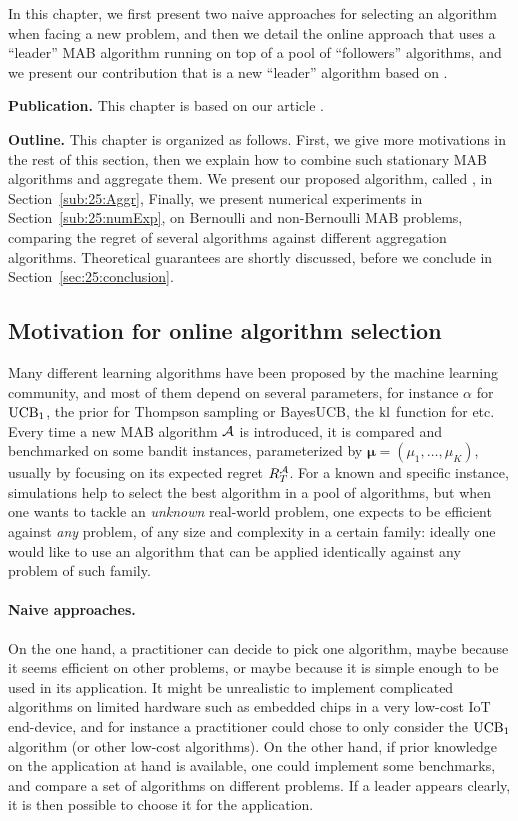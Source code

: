 In this chapter, we first present two naive approaches for selecting an algorithm when facing a new problem, and then we detail the online approach that uses a ``leader'' MAB algorithm running on top of a pool of ``followers'' algorithms, and we present our contribution that is a new ``leader'' algorithm based on \ExpQ.


\textbf{Publication.}
%
This chapter is based on our article \cite{Besson2018WCNC}.


\textbf{Outline.}
%
This chapter is organized as follows.
First, we give more motivations in the rest of this section, then we explain how to combine such stationary MAB algorithms and aggregate them.
We present our proposed algorithm, called \Aggr, in Section~\ref{sub:25:Aggr},
Finally, we present numerical experiments in Section~\ref{sub:25:numExp},
on Bernoulli and non-Bernoulli MAB problems,
comparing the regret of several algorithms against different aggregation algorithms.
Theoretical guarantees are shortly discussed, before we conclude in Section~\ref{sec:25:conclusion}.


\subsection{Motivation for online algorithm selection}\label{sub:25:introduction}

Many different learning algorithms have been proposed by the machine learning community,
and most of them depend on several parameters, for instance $\alpha$ for $\mathrm{UCB}_1$, the prior for Thompson sampling or BayesUCB,
the $\mathrm{kl}$ function for \klUCB{} etc.
Every time a new MAB algorithm $\mathcal{A}$ is introduced, it is compared and benchmarked on some bandit instances, parameterized by $\boldsymbol{\mu} = (\mu_1,\dots,\mu_K)$, usually by focusing on its expected regret $R_T^{\mathcal{A}}$.
%
For a known and specific instance, simulations help to select the best algorithm in a pool of algorithms,
but when one wants to tackle an \emph{unknown} real-world problem, one expects to be efficient against \emph{any} problem, of any size and complexity in a certain family:
ideally one would like to use an algorithm that can be applied identically against any problem of such family.


\paragraph{Naive approaches.}
%
On the one hand, a practitioner can decide to pick one algorithm, maybe because it seems efficient on other problems, or maybe because it is simple enough to be used in its application. It might be unrealistic to implement complicated algorithms on limited hardware such as embedded chips in a very low-cost IoT end-device, and for instance a practitioner could chose to only consider the $\mathrm{UCB}_1$ algorithm (or other low-cost algorithms).
%
On the other hand, if prior knowledge on the application at hand is available, one could implement some benchmarks, and compare a set of algorithms on different problems. If a leader appears clearly, it is then possible to choose it for the application.


